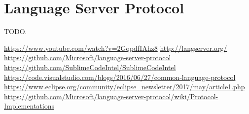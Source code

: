 \section{Language Server Protocol}

TODO.

\url{https://www.youtube.com/watch?v=2GqpdfIAhz8}
\url{http://langserver.org/}
\url{https://github.com/Microsoft/language-server-protocol}
\url{https://github.com/SublimeCodeIntel/SublimeCodeIntel}
\url{https://code.visualstudio.com/blogs/2016/06/27/common-language-protocol}
\url{https://www.eclipse.org/community/eclipse_newsletter/2017/may/article1.php}
\url{https://github.com/Microsoft/language-server-protocol/wiki/Protocol-Implementations}


